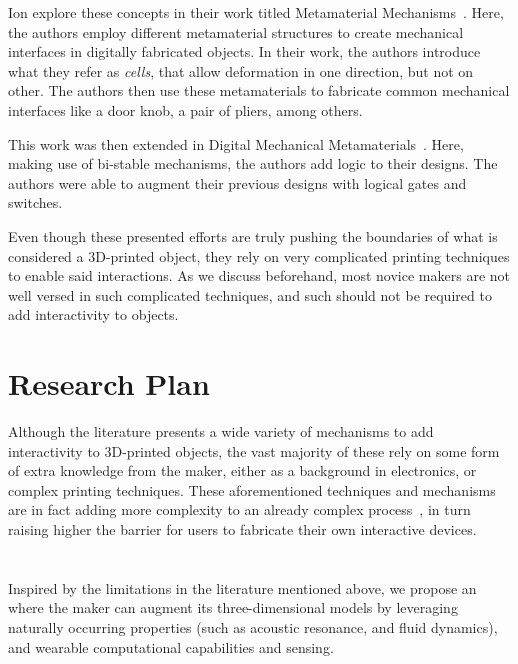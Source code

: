       Ion \etal explore these concepts in their work titled Metamaterial
      Mechanisms~\cite{Ion:2016kx}. Here, the authors employ different
      metamaterial structures to create mechanical interfaces in digitally
      fabricated objects. In their work, the authors introduce what they refer
      as \emph{cells}, that allow deformation in one direction, but not on
      other. The authors then use these metamaterials to fabricate common
      mechanical interfaces like a door knob, a pair of pliers, among others.

      This work was then extended in Digital Mechanical
      Metamaterials~\cite{Ion:2017bo}. Here, making use of bi-stable
      mechanisms, the authors add logic to their designs. The authors were able
      to augment their previous designs with logical gates and switches.

      Even though these presented efforts are truly pushing the boundaries of
      what is considered a 3D-printed object, they rely on very complicated
      printing techniques to enable said interactions. As we discuss
      beforehand, most novice makers are not well versed in such complicated
      techniques, and such should not be required to add interactivity to
      objects.

  \section{Research Plan}
    Although the literature presents a wide variety of mechanisms to add
    interactivity to 3D-printed objects, the vast majority of these rely on
    some form of extra knowledge from the maker, either as a background in
    electronics, or complex printing techniques. These aforementioned
    techniques and mechanisms are in fact adding more complexity to an already
    complex process~\cite{Hudson:2016hi, Mellis:2012ba, Weichel:2014ed}, in
    turn raising higher the barrier for users to fabricate their own
    interactive devices.

  \section{\itoolkit}
    Inspired by the limitations in the literature mentioned above, we propose
    an \itoolkit where the maker can augment its three-dimensional models by
    leveraging naturally occurring properties (such as acoustic resonance, and
    fluid dynamics), and wearable computational capabilities and sensing.

